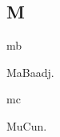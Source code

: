\begin{multicols*}{2}
\section*{M}

\begin{dictroot}{m}{b}
    \begin{dictentry}{MaBa}{adj.}
    \end{dictentry}
\end{dictroot}

\begin{dictroot}{m}{c}
    \begin{dictentry}{MuCu}{n.}
    \end{dictentry}
\end{dictroot}


\end{multicols*}
